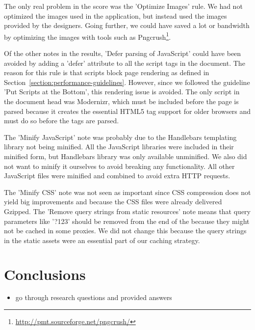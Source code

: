 The only real problem in the score was the 'Optimize Images' rule. We
had not optimized the images used in the application, but instead used
the images provided by the designers. Going further, we could have
saved a lot or bandwidth by optimizing the images with tools such as
Pngcrush\footnote{\url{http://pmt.sourceforge.net/pngcrush/}}.

Of the other notes in the results, 'Defer parsing of JavaScript' could
have been avoided by adding a 'defer' attribute to all the script tags
in the document. The reason for this rule is that scripts block page
rendering as defined in
Section~\ref{section:performance-guidelines}. However, since we
followed the guideline 'Put Scripts at the Bottom', this rendering
issue is avoided. The only script in the document head was Modernizr,
which must be included before the page is parsed because it creates
the essential HTML5 tag support for older browsers and must do so
before the tags are parsed.

The 'Minify JavaScript' note was probably due to the Handlebars
templating library not being minified. All the JavaScript libraries
were included in their minified form, but Handlebars library was only
available unminified. We also did not want to minify it ourselves to
avoid breaking any functionality. All other JavaScript files were
minified and combined to avoid extra HTTP requests.

The 'Minify CSS' note was not seen as important since CSS compression
does not yield big improvements and because the CSS files were already
delivered Gzipped. The 'Remove query strings from static resources'
note means that query parameters like '?123' should be removed from
the end of the  because they might not be cached in some
proxies. We did not change this because the query strings in the
static assets were an essential part of our caching strategy.

\section{Conclusions}

\begin{itemize}
\item go through research questions and provided answers
\end{itemize}
